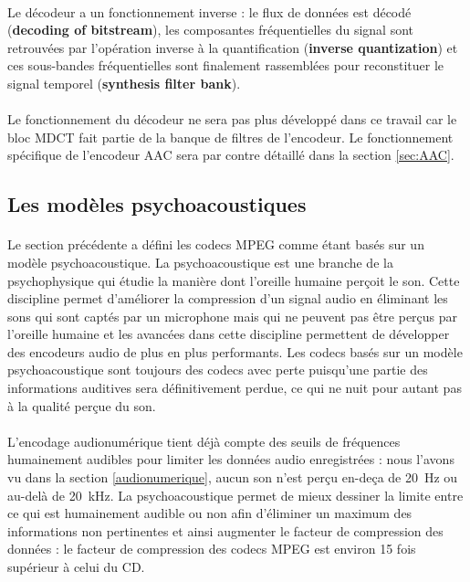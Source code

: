 \documentclass{article}
\begin{document}
    \paragraph{}
    Le décodeur a un fonctionnement inverse : le flux de données est décodé (\textbf{decoding of bitstream}), les composantes fréquentielles du signal sont retrouvées par l'opération inverse à la quantification (\textbf{inverse quantization}) et ces sous-bandes fréquentielles sont finalement rassemblées pour reconstituer le signal temporel (\textbf{synthesis filter bank}).

    \paragraph{}
    Le fonctionnement du décodeur ne sera pas plus développé dans ce travail car le bloc MDCT fait partie de la banque de filtres de l'encodeur. Le fonctionnement spécifique de l'encodeur AAC sera par contre détaillé dans la section \ref{sec:AAC}.


    \subsection{Les modèles psychoacoustiques}
    \paragraph{}
    Le section précédente a défini les codecs MPEG comme étant basés sur un modèle psychoacoustique. La psychoacoustique est une branche de la psychophysique qui étudie la manière dont l'oreille humaine perçoit le son\cite{wiki:psychoacoustic}. Cette discipline permet d'améliorer la compression d'un signal audio en éliminant les sons qui sont captés par un microphone mais qui ne peuvent pas être perçus par l'oreille humaine et les avancées dans cette discipline permettent de développer des encodeurs audio de plus en plus performants. Les codecs basés sur un modèle psychoacoustique sont toujours des codecs avec perte puisqu'une partie des informations auditives sera définitivement perdue, ce qui ne nuit pour autant pas à la qualité perçue du son.

    \paragraph{}
    L'encodage audionumérique tient déjà compte des seuils de fréquences humainement audibles pour limiter les données audio enregistrées : nous l'avons vu dans la section \ref{audionumerique}, aucun son n'est perçu en-deça de \SI{20}{\hertz} ou au-delà de \SI{20}{\kilo\hertz}. La psychoacoustique permet de mieux dessiner la limite entre ce qui est humainement audible ou non afin d'éliminer un maximum des informations non pertinentes et ainsi augmenter le facteur de compression des données : le facteur de compression des codecs MPEG est environ 15 fois supérieur à celui du CD\cite{2019-Herre-Dick}.
\end{document}
